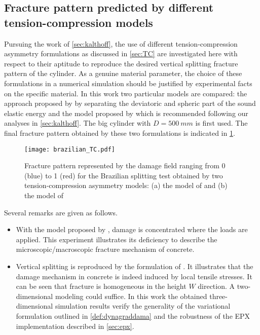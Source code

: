 \subsection{Fracture pattern predicted by different tension-compression models}
Pursuing the work of \cref{sec:kalthoff}, the use of different tension-compression asymmetry formulations as discussed in \cref{sec:TC} are investigated here with respect to their aptitude to reproduce the desired vertical splitting fracture pattern of the cylinder. As a genuine material parameter, the choice of these formulations in a numerical simulation should be justified by experimental facts on the specific material. In this work two particular models are compared: the approach proposed by \cite{AmorMarigoMaurini:2009} by separating the deviatoric and spheric part of the sound elastic energy and the model proposed by \cite{FreddiRoyer-Carfagni:2010} which is recommended following our analyses in \cref{sec:kalthoff}. The big cylinder with $D=\SI{500}{mm}$ is first used. The final fracture pattern obtained by these two formulations is indicated in \cref{fig:brazilian_tc}.
\begin{figure}[htbp]
\centering
\texttt{[image: brazilian\_TC.pdf]}
\caption{Fracture pattern represented by the damage field ranging from 0 (blue) to 1 (red) for the Brazilian splitting test obtained by two tension-compression asymmetry models: (a) the model of \cite{AmorMarigoMaurini:2009} and (b) the model of \cite{FreddiRoyer-Carfagni:2010}} \label{fig:brazilian_tc}
\end{figure}
Several remarks are given as follows.
\begin{itemize}
\item With the model proposed by \cite{AmorMarigoMaurini:2009}, damage is concentrated where the loads are applied. This experiment illustrates its deficiency to describe the microscopic/macroscopic fracture mechanism of concrete.

\item Vertical splitting is reproduced by the formulation of \cite{FreddiRoyer-Carfagni:2010}. It illustrates that the damage mechanism in concrete is indeed induced by local tensile stresses. It can be seen that fracture is homogeneous in the height $W$ direction. A two-dimensional modeling could suffice. In this work the obtained three-dimensional simulation results verify the generality of the variational formulation outlined in \cref{def:dynagraddama} and the robustness of the EPX implementation described in \cref{sec:epx}.
\end{itemize}

